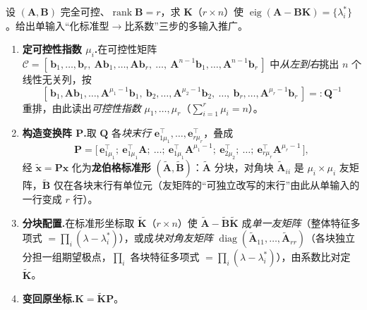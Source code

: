 \begin{algo}
\label{algo:syn-multiinput}
设 $(\mathbf A,\mathbf B)$ 完全可控、$\operatorname{rank}\mathbf B=r$，求 $\mathbf K$（$r\times n$）使 $\operatorname{eig}(\mathbf A-\mathbf B\mathbf K)=\{\lambda_i^*\}$。给出单输入“化标准型$\to$比系数”三步的多输入推广。
\begin{enumerate}
  \item \textbf{定可控性指数 $\mu_i$.}\;在可控性矩阵 $\mathcal C=[\,\mathbf b_1,\dots,\mathbf b_r,\ \mathbf A\mathbf b_1,\dots,\mathbf A\mathbf b_r,\ \dots,\ \mathbf A^{n-1}\mathbf b_1,\dots,\mathbf A^{n-1}\mathbf b_r\,]$ 中\emph{从左到右}挑出 $n$ 个线性无关列，按
  \[
    [\,\mathbf b_1,\mathbf A\mathbf b_1,\dots,\mathbf A^{\mu_1-1}\mathbf b_1,\ \mathbf b_2,\dots,\mathbf A^{\mu_2-1}\mathbf b_2,\ \dots,\ \mathbf b_r,\dots,\mathbf A^{\mu_r-1}\mathbf b_r\,]=:\mathbf Q^{-1}
  \]
  重排，由此读出\emph{可控性指数} $\mu_1,\dots,\mu_r$（$\sum_{i=1}^r\mu_i=n$）。
  \item \textbf{构造变换阵 $\mathbf P$.}\;取 $\mathbf Q$ 各\emph{块末行} $\mathbf e_{1\mu_1}^\top,\dots,\mathbf e_{r\mu_r}^\top$，叠成
  \[
    \mathbf P=\big[\,\mathbf e_{1\mu_1}^\top;\ \mathbf e_{1\mu_1}^\top\mathbf A;\ \dots;\ \mathbf e_{1\mu_1}^\top\mathbf A^{\mu_1-1};\ \mathbf e_{2\mu_2}^\top;\ \dots;\ \mathbf e_{r\mu_r}^\top\mathbf A^{\mu_r-1}\,\big],
  \]
  经 $\tilde{\mathbf x}=\mathbf P\mathbf x$ 化为\textbf{龙伯格标准形} $(\tilde{\mathbf A},\tilde{\mathbf B})$：$\tilde{\mathbf A}$ 分块，对角块 $\tilde{\mathbf A}_{ii}$ 是 $\mu_i\times\mu_i$ 友矩阵，$\tilde{\mathbf B}$ 仅在各块末行有单位元（友矩阵的“可独立改写的末行”由此从单输入的一行变成 $r$ 行）。
  \item \textbf{分块配置.}\;在标准形坐标取 $\tilde{\mathbf K}$（$r\times n$）使 $\tilde{\mathbf A}-\tilde{\mathbf B}\tilde{\mathbf K}$ 成\emph{单一友矩阵}（整体特征多项式 $=\prod_i(\lambda-\lambda_i^*)$），或成\emph{块对角友矩阵} $\operatorname{diag}(\tilde{\mathbf A}_{11},\dots,\tilde{\mathbf A}_{rr})$（各块独立分担一组期望极点，$\prod_i$ 各块特征多项式 $=\prod_i(\lambda-\lambda_i^*)$），由系数比对定 $\tilde{\mathbf K}$。
  \item \textbf{变回原坐标.}\;$\mathbf K=\tilde{\mathbf K}\mathbf P$。
\end{enumerate}
\end{algo}

